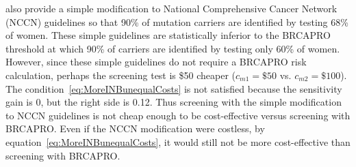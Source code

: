 \documentclass[11pt, letterpaper]{article}
\begin{document}
\cite{Best2019} also provide a simple modification to National Comprehensive Cancer Network (NCCN) guidelines so that 90\% of mutation carriers are identified by testing 68\% of women.  These simple guidelines are statistically inferior to the BRCAPRO threshold at which 90\% of carriers are identified by testing only 60\% of women.  However, since these simple guidelines do not require a BRCAPRO risk calculation, perhaps the screening test is \$50 cheaper ($c_{m1}=\$50$ vs. $c_{m2}=\$100$).  The condition~\ref{eq:MoreINBunequalCosts} is not satisfied because the sensitivity gain is 0, but the right side is 0.12.  Thus screening with the simple modification to NCCN guidelines is not cheap enough to be cost-effective versus screening with BRCAPRO.  Even if the NCCN modification were costless, by equation~\ref{eq:MoreINBunequalCosts}, it would still not be more cost-effective than screening with BRCAPRO.





\end{document}
